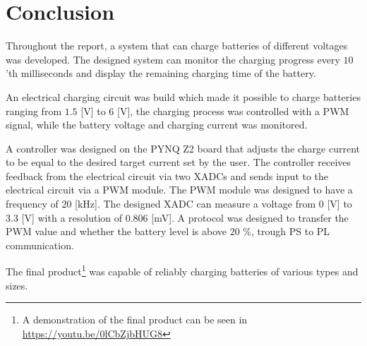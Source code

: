 \documentclass[../report.tex]{subfiles}
\begin{document}
\section{Conclusion} \label{sec:conclusion}
Throughout the report, a system that can charge batteries of different voltages was developed. The designed system can monitor the charging progress every $10$'th milliseconds and display the remaining charging time of the battery.

An electrical charging circuit was build which made it possible to charge batteries ranging from $1.5$ [V] to $6$ [V], the charging process was controlled with a PWM signal, while the battery voltage and charging current was monitored.

A controller was designed on the PYNQ Z2 board that adjusts the charge current to be equal to the desired target current set by the user. The controller receives feedback from the electrical circuit via two XADCs and sends input to the electrical circuit via a PWM module. The PWM module was designed to have a frequency of $20$ [kHz]. The designed XADC can measure a voltage from $0$ [V] to $3.3$ [V] with a resolution of $0.806$ [mV]. A protocol was designed to transfer the PWM value and whether the battery level is above $20$ \%, trough PS to PL communication.

The final product\footnote{A demonstration of the final product can be seen in \url{https://youtu.be/0lCbZjbHUG8}} was capable of reliably charging batteries of various types and sizes.
\end{document}
